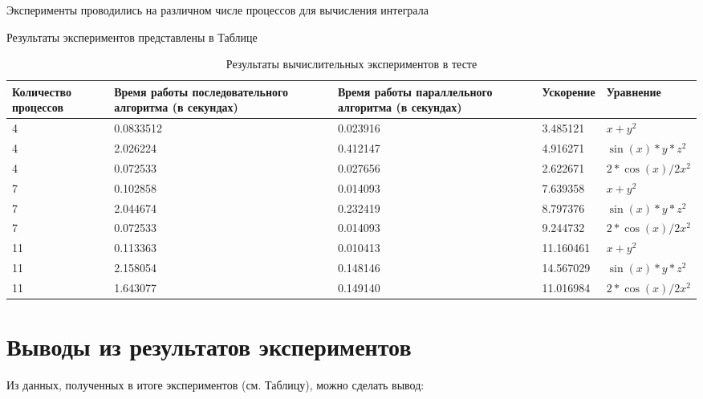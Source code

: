 \documentclass{report}
\begin{document}
\par Эксперименты проводились на различном числе процессов для вычисления интеграла

\par Результаты экспериментов представлены в Таблице

\begin{table}[!h]
\caption{Результаты вычислительных экспериментов в тесте}
\centering
\begin{tabular}{| p{2cm} | p{3cm} | p{4cm} | p{2cm} |p{4cm} |}
\hline
Количество процессов & Время работы последовательного алгоритма (в секундах) & Время работы параллельного алгоритма (в секундах) & Ускорение & Уравнение  \\[5pt]
\hline
4        & 0.0833512        & 0.023916     & 3.485121  &$x+y^2$    \\
\hline
4        & 2.026224        & 0.412147    & 4.916271    &$\sin(x)*y*z^2$    \\
\hline
4       & 0.072533      &0.027656     &2.622671     &$2*\cos(x)/ 2x^2$   \\
\hline
7        & 0.102858        &0.014093     & 7.639358  &$x+y^2$    \\
\hline
7        & 2.044674        &0.232419    &8.797376    &$\sin(x)*y*z^2$    \\
\hline
7       & 0.072533      &0.014093     &9.244732     &$2*\cos(x)/ 2x^2$   \\
\hline
11        & 0.113363        & 0.010413     & 11.160461 &$x+y^2$    \\
\hline
11      &2.158054        & 0.148146    & 14.567029    &$\sin(x)*y*z^2$    \\
\hline
11      &1.643077      &0.149140     &11.016984     &$2*\cos(x)/ 2x^2$   \\
\hline
\end{tabular}
\end{table}


\newpage

\section*{Выводы из результатов экспериментов}

\par Из данных, полученных в итоге экспериментов (см. Таблицу), можно сделать вывод:
\end{document}

